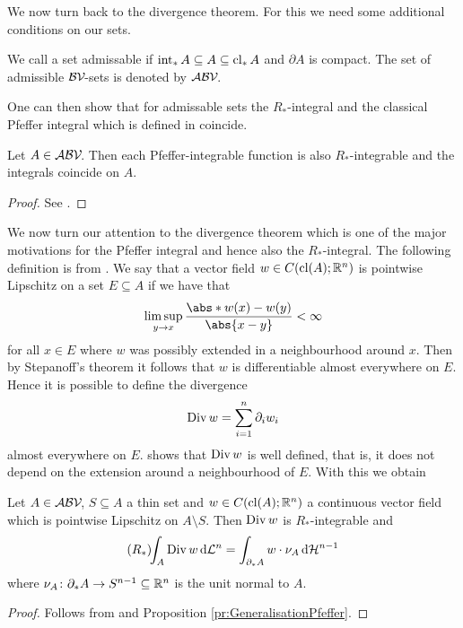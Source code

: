 \noindent We now turn back to the divergence theorem. For this we need some additional conditions on our sets.

\begin{definition}
We call a set admissable if $\operatorname{int}_*A\subseteq A\subseteq \operatorname{cl}_*A$ and $\partial A$ is compact. The set of admissible $\mathcal{BV\!}$-sets is denoted by $\mathcal{ABV\!}$.
\end{definition}

\noindent
One can then show that for admissable sets the $R_*$-integral and the classical Pfeffer integral which is defined in \cite{Pfe1992} coincide.

\begin{proposition}\label{pr:GeneralisationPfeffer}
Let $A\in\mathcal{ABV\!}$. Then each Pfeffer-integrable function is also $R_*$-integrable and the integrals coincide on $A$.
\end{proposition}
\begin{proof}
See \cite[Corollary 3.18]{Pfe2016}.
\end{proof}

\noindent We now turn our attention to the divergence theorem which is one of the major motivations for the Pfeffer integral and hence also the $R_*$-integral.
The following definition is from \cite{Pfe1991}.
We say that a vector field $w\in C(\operatorname{cl}(A);\mathbb{R}^n)$ is pointwise Lipschitz on a set $E\subseteq A$ if we have that
\begin{align*}
	\limsup_{y\to x}\frac{\abs*{w(x)-w(y)}}{\abs{x-y}}<\infty
\end{align*}
for all $x\in E$ where $w$ was possibly extended in a neighbourhood around $x$. Then by Stepanoff's theorem it follows that $w$ is differentiable almost everywhere on $E$. Hence it is possible to define the divergence
\begin{align*}
	\operatorname{Div} w=\sum_{i=1}^n\partial_iw_i
\end{align*}
almost everywhere on $E$. \cite[Lemma 5.16]{Pfe1991} shows that $\operatorname{Div} w$ is well defined, that is, it does not depend on the extension around a neighbourhood of $E$. With this we obtain

\begin{theorem}\label{th:divergence}
Let $A\in\mathcal{ABV\!}$, $S\subseteq A$ a thin set and $w\in C(\operatorname{cl}(A);\mathbb{R}^n)$ a continuous vector field which is pointwise Lipschitz on $A\setminus S$. Then $\operatorname{Div} w$ is $R_*$-integrable and
\begin{align*}
	(R_*)\!\!\int_A\operatorname{Div} w\,\mathrm{d} \mathcal{L}^n=\int_{\partial_* A}w\cdot \nu_A\,\mathrm{d} \mathcal{H}^{n-1}
\end{align*}
where $\nu_A\colon \partial_* A\to S^{n-1}\subseteq\mathbb{R}^n$ is the unit normal to $A$.
\end{theorem}
\begin{proof}
Follows from \cite[Theorem 5.19]{Pfe1991} and Proposition \ref{pr:GeneralisationPfeffer}.
\end{proof}

